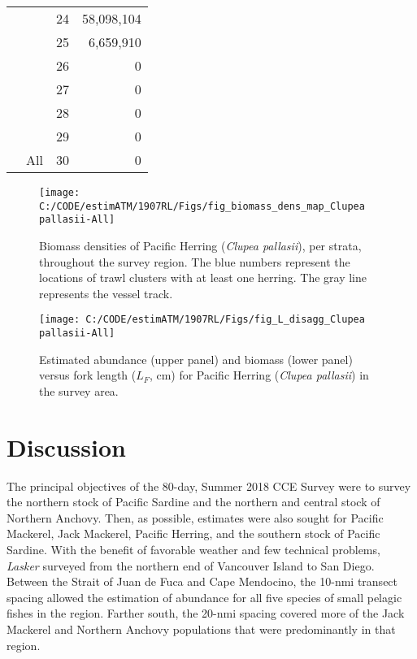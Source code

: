 \documentclass[]{article}
\begin{document}
\begin{longtable}{>{\em}l|l|r|r}
\cline{3-4}
 &  & 24 & 58,098,104\\
\cline{3-4}
\rowcolor{gray!6}   &  & 25 & 6,659,910\\
\cline{3-4}
 &  & 26 & 0\\
\cline{3-4}
\rowcolor{gray!6}   &  & 27 & 0\\
\cline{3-4}
 &  & 28 & 0\\
\cline{3-4}
\rowcolor{gray!6}   &  & 29 & 0\\
\cline{3-4}
\multirow{-30}{*}{\raggedright\arraybackslash Clupea pallasii} & \multirow{-30}{*}{\raggedright\arraybackslash All} & 30 & 0\\
\hline
\end{longtable}



\begin{figure}[H]

{\centering \texttt{[image: C:/CODE/estimATM/1907RL/Figs/fig\_biomass\_dens\_map\_Clupea pallasii-All]} 

}

\caption{Biomass densities of Pacific Herring (\emph{Clupea pallasii}), per strata, throughout the survey region. The blue numbers represent the locations of trawl clusters with at least one herring. The gray line represents the vessel track.}\label{fig:biom-dens-her}
\end{figure}

\newpage



\begin{figure}[H]

{\centering \texttt{[image: C:/CODE/estimATM/1907RL/Figs/fig\_L\_disagg\_Clupea pallasii-All]} 

}

\caption{Estimated abundance (upper panel) and biomass (lower panel) versus fork length (\(L_F\), cm) for Pacific Herring (\emph{Clupea pallasii}) in the survey area.}\label{fig:l-disagg-her}
\end{figure}

\newpage

\hypertarget{discussion}{%
\section{Discussion}\label{discussion}}

The principal objectives of the 80-day, Summer 2018 CCE Survey were to survey the northern stock of Pacific Sardine and the northern and central stock of Northern Anchovy. Then, as possible, estimates were also sought for Pacific Mackerel, Jack Mackerel, Pacific Herring, and the southern stock of Pacific Sardine. With the benefit of favorable weather and few technical problems, \emph{Lasker} surveyed from the northern end of Vancouver Island to San Diego. Between the Strait of Juan de Fuca and Cape Mendocino, the 10-nmi transect spacing allowed the estimation of abundance for all five species of small pelagic fishes in the region. Farther south, the 20-nmi spacing covered more of the Jack Mackerel and Northern Anchovy populations that were predominantly in that region.
\end{document}

